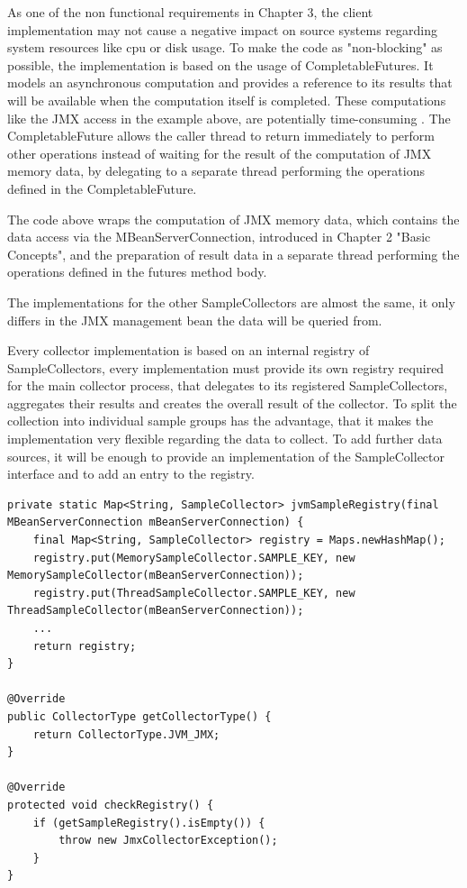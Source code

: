 As one of the non functional requirements in Chapter 3, the client implementation may not cause a negative impact
on source systems regarding system resources like cpu or disk usage. To make the code as "non-blocking" as possible,
the implementation is based on the usage of CompletableFutures. It models an asynchronous computation and provides
a reference to its results that will be available when the computation itself is completed. These computations like the JMX
access in the example above, are potentially time-consuming \cite{TODO}. The CompletableFuture allows the caller thread to return immediately
to perform other operations instead of waiting for the result of the computation of JMX memory data, by delegating to a
separate thread performing the operations defined in the CompletableFuture.

The code above wraps the computation of JMX memory data, which contains the data access via the MBeanServerConnection,
introduced in Chapter 2 "Basic Concepts", and the preparation of result data in a separate thread performing the operations defined
in the futures method body.

The implementations for the other SampleCollectors are almost the same, it only differs in the JMX management bean the data will
be queried from.

Every collector implementation is based on an internal registry of SampleCollectors, every implementation must provide its
own registry required for the main collector process, that delegates to its registered SampleCollectors,
aggregates their results and creates the overall result of the collector. To split the collection into individual sample groups has
the advantage, that it makes the implementation very flexible regarding the data to collect. To add further data sources, it
will be enough to provide an implementation of the SampleCollector interface and to add an entry to the registry.

\begin{lstlisting}[caption={Sample registry for "JvmCollector"}, captionpos=b, label={lst:jvmsampleregistry}]
private static Map<String, SampleCollector> jvmSampleRegistry(final MBeanServerConnection mBeanServerConnection) {
    final Map<String, SampleCollector> registry = Maps.newHashMap();
    registry.put(MemorySampleCollector.SAMPLE_KEY, new MemorySampleCollector(mBeanServerConnection));
    registry.put(ThreadSampleCollector.SAMPLE_KEY, new ThreadSampleCollector(mBeanServerConnection));
    ...
    return registry;
}

@Override
public CollectorType getCollectorType() {
    return CollectorType.JVM_JMX;
}

@Override
protected void checkRegistry() {
    if (getSampleRegistry().isEmpty()) {
        throw new JmxCollectorException();
    }
}
\end{lstlisting}

